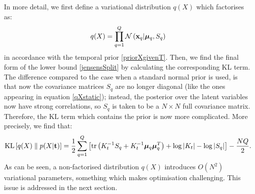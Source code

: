 In more detail, we first define a variational distribution $q(X)$ which factorises as:
%
\begin{equation}
  q(X) = \prod_{q=1}^Q \mathcal{N} \left( \mathbf{x}_q | \boldsymbol \mu_q, S_q \right)
\end{equation}
%
\noindent in accordance with the temporal prior \eqref{priorXgivenT}. Then,
we find the final form of the lower bound \eqref{jensensSplit} by calculating
the corresponding KL term.
The difference compared to the case when a standard normal prior is used, is that now the covariance matrices 
$S_q$ are no longer diagonal (like the ones appearing in equation \eqref{qXstatic}); instead, the 
posterior over the latent variables now have strong correlations, so $S_q$ is taken to be a $N \times N$ full covariance
matrix. Therefore, 
the $\text{KL}$ term which contains the prior is now more complicated. More precisely, we find that:
\begin{equation}
\label{KLasSummationOverQ} 
\text{KL} \left[ q(X) \parallel p(X | \mathbf{t}) \right] = \frac{1}{2} \sum_{q=1}^{Q} \left[ 
	  \text{tr} \left( K_t^{-1} S_q 
	                 + K_t^{-1} \boldsymbol \mu_q \boldsymbol \mu_q^T \right)
	  +\log \vert K_t \vert
	  - \log \vert S_q \vert
 \right] - \frac{NQ}{2}.
\end{equation}
As can be seen, a non-factorised distribution $q(X)$ introduces $O(N^2)$ variational parameters,
something which makes optimisation challenging.
This issue is addressed in the next section.







